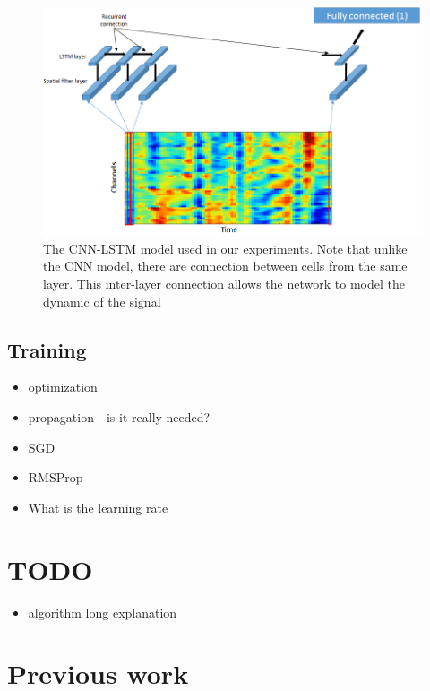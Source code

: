 \documentclass[
12pt, %
english, %
doublespacing, %
headsepline, %
]{MastersDoctoralThesis} %
\begin{document}
\begin{figure}
\centering
\includegraphics[width=1.1\linewidth]{Figures/LSTM_CNN_detailed}
\caption{The CNN-LSTM model used in our experiments. Note that unlike the CNN model, there are connection between cells from the same layer. This inter-layer connection allows the network to model the dynamic of the signal}
\label{fig:LSTM_CNN_detailed}
\end{figure}






\subsection{Training}
\begin{itemize}
	\item optimization
	\item propagation - is it really needed?
	\item SGD
	\item RMSProp
	\item What is the learning rate
\end{itemize}
\textcolor{red}{}


\section{TODO}
\begin{itemize}
	\item algorithm long explanation
\end{itemize}


\section{Previous work}
\end{document}

